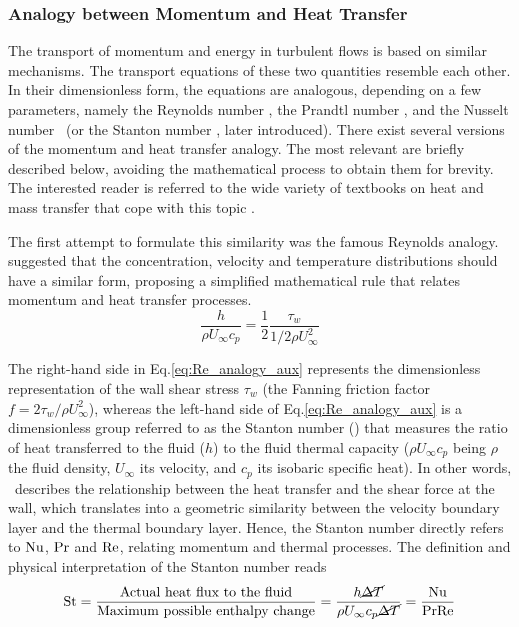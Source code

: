 \subsubsection*{Analogy between Momentum and Heat Transfer}

The transport of momentum and energy in turbulent flows is based on similar mechanisms. The transport equations of these two quantities resemble each other. In their dimensionless form, the equations are analogous, depending on a few parameters, namely the Reynolds number \nRe, the Prandtl number \nPr, and the Nusselt number \nNu~(or the Stanton number \nSt, later introduced). There exist several versions of the momentum and heat transfer analogy. The most relevant are briefly described below, avoiding the mathematical process to obtain them for brevity. The interested reader is referred to the wide variety of textbooks on heat and mass transfer that cope with this topic \citep[\eg][]{bergman2011fundamentals,Lienhard2020}.

The first attempt to formulate this similarity was the famous Reynolds analogy. \citet{reynolds1874analogy} suggested that the concentration, velocity and temperature distributions should have a similar form, proposing a simplified mathematical rule that relates momentum and heat transfer processes.
\begin{equation}\label{eq:Re_analogy_aux}
    \frac{h}{\rho U_\infty c_p} = \frac{1}{2}\frac{\tau_w}{1/2\rho U_\infty^2}
\end{equation}

The right-hand side in Eq.\eqref{eq:Re_analogy_aux} represents the dimensionless representation of the wall shear stress $\tau_w$ (the Fanning friction factor $f = 2\tau_w / \rho U_\infty^2$), whereas the left-hand side of Eq.\eqref{eq:Re_analogy_aux} is a dimensionless group referred to as the Stanton number (\nSt) that measures the ratio of heat transferred to the fluid ($h$) to the fluid thermal capacity ($\rho U_\infty c_p$ being $\rho$ the fluid density, $U_\infty$ its velocity, and $c_p$ its isobaric specific heat). In other words, \nSt~describes the relationship between the heat transfer and the shear force at the wall, which translates into a geometric similarity between the velocity boundary layer and the thermal boundary layer. Hence, the Stanton number directly refers to $\mbox{$\mathrm{Nu}$}$, $\mbox{$\mathrm{Pr}$}$ and $\mbox{$\mathrm{Re}$}$, relating momentum and thermal processes. The definition and physical interpretation of the Stanton number reads
\begin{equation} \label{eq:Stanton}
    \mbox{$\mathrm{St}$} = \frac{\text{Actual heat flux to the fluid}}{\text{Maximum possible enthalpy change}} = \frac{h\cancel{\Delta T}}{\rho U_\infty c_p\cancel{\Delta T}} = \frac{\mbox{$\mathrm{Nu}$}}{\mbox{$\mathrm{Pr}$}\mbox{$\mathrm{Re}$}}
\end{equation}

